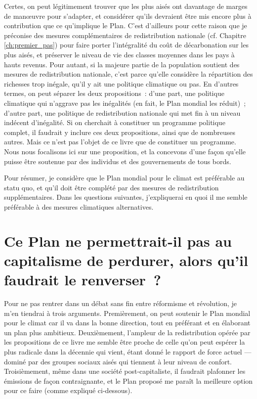 \documentclass[a5paper,french,openany]{memoir}
\begin{document}
Certes, on peut légitimement trouver que les plus aisés ont davantage de marges de manœuvre pour s'adapter, et considérer qu'ils devraient être mis encore plus à contribution que ce qu'implique le Plan. C'est d'ailleurs pour cette raison que je préconise des mesures complémentaires de redistribution nationale (cf. Chapitre \ref{ch:premier_pas}) pour faire porter l'intégralité du coût de décarbonation sur les plus aisés, et préserver le niveau de vie des classes moyennes dans les pays à hauts revenus. Pour autant, si la majeure partie de la population soutient des mesures de redistribution nationale, c'est parce qu'elle considère la répartition des richesses trop inégale, qu'il y ait une politique climatique ou pas. En d'autres termes, on peut séparer les deux propositions~: d'une part, une politique climatique qui n'aggrave pas les inégalités (en fait, le Plan mondial les réduit)~; d'autre part, une politique de redistribution nationale qui met fin à un niveau indécent d'inégalité. Si on cherchait à constituer un programme politique complet, il faudrait y inclure ces deux propositions, ainsi que de nombreuses autres. Mais ce n'est pas l'objet de ce livre que de constituer un programme. Nous nous focalisons ici sur une proposition, et la concevons d'une façon qu'elle puisse être soutenue par des individus et des gouvernements de tous bords. 

Pour résumer, je considère que le Plan mondial pour le climat est préférable au statu quo, et qu'il doit être complété par des mesures de redistribution supplémentaires. Dans les questions suivantes, j'expliquerai en quoi il me semble préférable à des mesures climatiques alternatives. 


\section*{\normalsize Ce Plan ne permettrait-il pas au capitalisme de perdurer, alors qu'il faudrait le renverser~?}\label{q:capitalisme}

Pour ne pas rentrer dans un débat sans fin entre réformisme et révolution, je m'en tiendrai à trois arguments. Premièrement, on peut soutenir le Plan mondial pour le climat car il va dans la bonne direction, tout en préférant et en élaborant un plan plus ambitieux. Deuxièmement, l'ampleur de la redistribution opérée par les propositions de ce livre me semble être proche de celle qu'on peut espérer la plus radicale %
dans la décennie qui vient, étant donné le rapport de force actuel --- dominé par des groupes sociaux aisés qui tiennent à leur niveau de confort. %
Troisièmement, même dans une société post-capitaliste, il faudrait plafonner les émissions de façon contraignante, et le Plan proposé me paraît la meilleure option pour ce faire (comme expliqué ci-dessous). 
\end{document}
